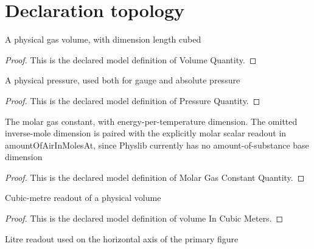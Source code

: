 \section{Declaration topology}
\begin{definition}
  \label{def:physics:phyx-mini-0336:phyxminiproblems-problemphyxmini0336-volumequantity}
  A physical gas volume, with dimension length cubed
\end{definition}
\begin{proof}
  This is the declared model definition of Volume Quantity.
\end{proof}
\begin{definition}
  \label{def:physics:phyx-mini-0336:phyxminiproblems-problemphyxmini0336-pressurequantity}
  A physical pressure, used both for gauge and absolute pressure
\end{definition}
\begin{proof}
  This is the declared model definition of Pressure Quantity.
\end{proof}
\begin{definition}
  \label{def:physics:phyx-mini-0336:phyxminiproblems-problemphyxmini0336-molargasconstantquantity}
  The molar gas constant, with energy-per-temperature dimension. The omitted inverse-mole dimension is paired with the explicitly molar scalar readout in amountOfAirInMolesAt, since Physlib currently has no amount-of-substance base dimension
\end{definition}
\begin{proof}
  This is the declared model definition of Molar Gas Constant Quantity.
\end{proof}
\begin{definition}
  \label{def:physics:phyx-mini-0336:phyxminiproblems-problemphyxmini0336-volumeincubicmeters}
  Cubic-metre readout of a physical volume
\end{definition}
\begin{proof}
  This is the declared model definition of volume In Cubic Meters.
\end{proof}
\begin{definition}
  \label{def:physics:phyx-mini-0336:phyxminiproblems-problemphyxmini0336-volumeinliters}
  Litre readout used on the horizontal axis of the primary figure
\end{definition}
